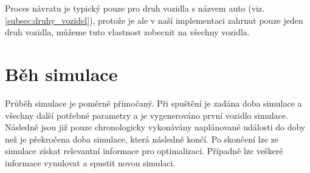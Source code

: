 Proces návratu je typický pouze pro druh vozidla s názvem auto 
(viz. \cref{subsec:druhy_vozidel}), protože je ale v naší implementaci
zahrnut pouze jeden druh vozidla, můžeme tuto vlastnost zobecnit na 
všechny vozidla.


\section{Běh simulace}

Průběh simulace je poměrně přímočaný. Při spuštění je zadána doba simulace a 
všechny další potřebné parametry a je vygenerováno první vozidlo simulace.
Následně jsou již pouze chronologicky vykonávány naplánované události do doby
než je překročena doba simulace, která následně končí. Po skončení lze ze simulace
získat relevantní informace pro optimalizaci. Případně lze veškeré informace
vynulovat a spustit novou simulaci.